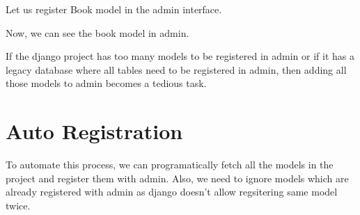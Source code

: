 \documentclass[letterpaper,11pt,english]{sphinxmanual}
\begin{document}
Let us register Book model in the admin interface.

\begin{sphinxVerbatim}[commandchars=\\\{\}]

   

   


 
        


 
\end{sphinxVerbatim}

Now, we can see the book model in admin.


If the django project has too many models to be registered in admin or if it has a legacy database where all tables need to be registered in admin, then adding all those models to admin becomes a tedious task.


\section{Auto Registration}
\label{\detokenize{admin_auto_register_models:auto-registration}}
To automate this process, we can programatically fetch all the models in the project and register them with admin. Also, we need to ignore models which are already registered with admin as django doesn’t allow regsitering same model twice.

\begin{sphinxVerbatim}[commandchars=\\\{\}]
   


  

   
     
\end{sphinxVerbatim}
\end{document}
